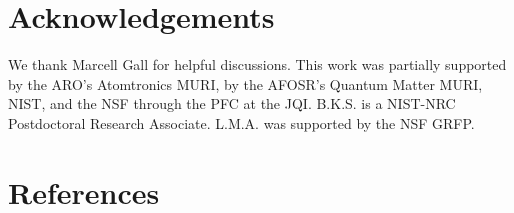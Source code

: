 \documentclass[12pt]{iopart}
\begin{document}
\section*{Acknowledgements}
We thank Marcell Gall for helpful discussions. This work was partially supported by the ARO’s Atomtronics MURI, by the
AFOSR’s Quantum Matter MURI, NIST, and the NSF through the PFC at the JQI. B.K.S. is
a NIST-NRC Postdoctoral Research Associate. L.M.A. was supported by the NSF GRFP.

\section*{References}
{}

\end{document}
